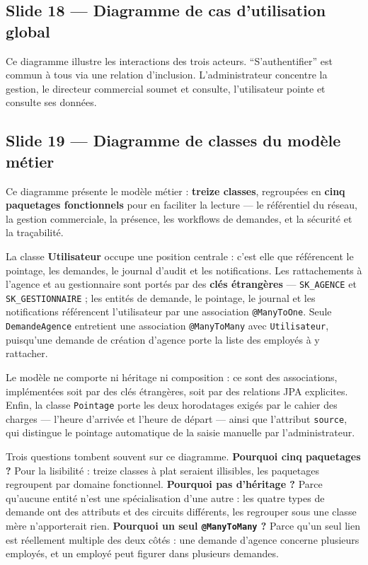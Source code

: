 \documentclass[a4paper,11pt]{article}
\begin{document}
\subsection*{Slide 18 --- Diagramme de cas d'utilisation global}

Ce diagramme illustre les interactions des trois acteurs.
\enquote{S'authentifier} est commun à tous via une relation d'inclusion.
L'administrateur concentre la gestion, le directeur commercial soumet et
consulte, l'utilisateur pointe et consulte ses données.

\subsection*{Slide 19 --- Diagramme de classes du modèle métier}

Ce diagramme présente le modèle métier : \textbf{treize classes}, regroupées en
\textbf{cinq paquetages fonctionnels} pour en faciliter la lecture --- le
référentiel du réseau, la gestion commerciale, la présence, les workflows de
demandes, et la sécurité et la traçabilité.

La classe \textbf{Utilisateur} occupe une position centrale : c'est elle que
référencent le pointage, les demandes, le journal d'audit et les notifications.
Les rattachements à l'agence et au gestionnaire sont portés par des \textbf{clés
étrangères} --- \texttt{SK\_AGENCE} et \texttt{SK\_GESTIONNAIRE} ; les entités de
demande, le pointage, le journal et les notifications référencent l'utilisateur
par une association \texttt{@ManyToOne}. Seule \texttt{DemandeAgence} entretient
une association \texttt{@ManyToMany} avec \texttt{Utilisateur}, puisqu'une
demande de création d'agence porte la liste des employés à y rattacher.

Le modèle ne comporte ni héritage ni composition : ce sont des associations,
implémentées soit par des clés étrangères, soit par des relations JPA
explicites. Enfin, la classe \texttt{Pointage} porte les deux horodatages exigés
par le cahier des charges --- l'heure d'arrivée et l'heure de départ --- ainsi
que l'attribut \texttt{source}, qui distingue le pointage automatique de la
saisie manuelle par l'administrateur.

\begin{coeur}
Trois questions tombent souvent sur ce diagramme.
\textbf{Pourquoi cinq paquetages ?} Pour la lisibilité : treize classes à plat
seraient illisibles, les paquetages regroupent par domaine fonctionnel.
\textbf{Pourquoi pas d'héritage ?} Parce qu'aucune entité n'est une
spécialisation d'une autre : les quatre types de demande ont des attributs et
des circuits différents, les regrouper sous une classe mère n'apporterait rien.
\textbf{Pourquoi un seul \texttt{@ManyToMany} ?} Parce qu'un seul lien est
réellement multiple des deux côtés : une demande d'agence concerne plusieurs
employés, et un employé peut figurer dans plusieurs demandes.
\end{coeur}
\end{document}

